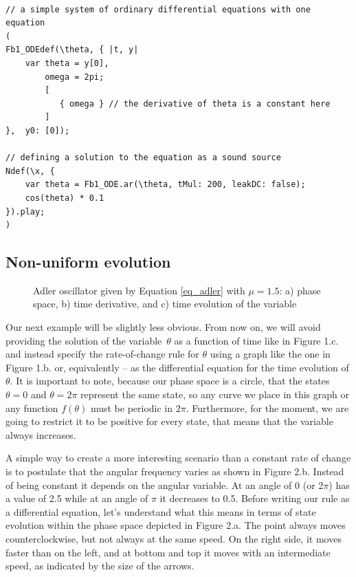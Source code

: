\documentclass{article}
\begin{document}
\begin{lstlisting}[frame=single,caption= Defining equation 1 as a sound source]

// a simple system of ordinary differential equations with one equation
(
Fb1_ODEdef(\theta, { |t, y| 
    var theta = y[0], 
        omega = 2pi; 
        [
           { omega } // the derivative of theta is a constant here
        ] 
},  y0: [0]);

// defining a solution to the equation as a sound source
Ndef(\x, { 
    var theta = Fb1_ODE.ar(\theta, tMul: 200, leakDC: false);
    cos(theta) * 0.1 
}).play;
)
\end{lstlisting}
\newpage

\subsection{Non-uniform evolution}

\begin{figure}[h]
    \centering
    \caption{Adler oscillator given by Equation \ref{eq_adler} with $\mu=1.5$: a) phase space, b) time derivative, and c) time evolution of the variable} 
    \label{fig_adler1}
\end{figure}

Our next example will be slightly less obvious. 
From now on, we will avoid providing the solution of the variable~$\theta$ as a function of time like in Figure 1.c. and instead specify the rate-of-change rule for $\theta$ using a graph like the one in Figure 1.b. or, equivalently -- as the differential equation for the time evolution of $\theta$.
It is important to note, because our phase space is a circle, that the states $\theta=0$ and $\theta=2\pi$ represent the same state, so any curve we place in this graph or any function $f(\theta)$ must be periodic in $2\pi$. 
Furthermore, for the moment, we are going to restrict it to be positive for every state, that means that the variable always increases. 

A simple way to create a more interesting scenario than a constant rate of change is to postulate that the angular frequency varies as shown in Figure 2.b. 
Instead of being constant it depends on the angular variable. 
At an angle of 0 (or $2\pi$) has a value of 2.5 while at an angle of $\pi$ it decreases to 0.5.
Before writing our rule as a differential equation, let’s understand what this means in terms of state evolution within the phase space depicted in Figure 2.a. 
The point always moves counterclockwise, but not always at the same speed. On the right side, it moves faster than on the left, and at bottom and top it moves with an intermediate speed, as indicated by the size of the arrows.
\end{document}
